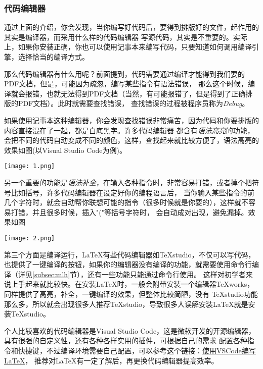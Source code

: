 \subsubsection{代码编辑器}


通过上面的介绍，你会发现，当你编写好代码后，要得到排版好的文件，起作用的其实是编译器，而采用什么样的代码编辑器
写源代码，其实是不重要的。实际上，如果你安装正确，你也可以使用记事本来编写代码，只要知道如何调用编译引擎，选择恰当的编译方式。

那么代码编辑器有什么用呢？前面提到，代码需要通过编译才能得到我们要的PDF文档，但是，可能因为疏忽，编写某些指令有语法错误，
那么这个时候，编译就会报错，也就无法得到PDF文档（当然，有可能报错了，但是得到了正确排版的PDF文档）。此时就需要查找错误，
查找错误的过程被程序员称为\emph{Debug}。

如果使用记事本这种编辑器，你会发现查找错误非常痛苦，因为代码和你要排版的内容直接混在了一起，都是白底黑字。许多代码编辑器
都含有\emph{语法高亮}的功能，会把不同的代码自动变成不同的颜色，这样，查找起来就比较方便了，语法高亮的效果如图(以Visual Studio Code为例)。
\begin{center}
  \texttt{[image: 1.png]}
\end{center}

另一个重要的功能是\emph{语法补全}，在输入各种指令时，非常容易打错，或者掉个把符号比如括号，许多代码编辑器在设定好你的编程语言后，
当你输入某些指令的前几个字符时，就会自动帮你联想可能的指令（很多时候就是你要的），这样就不容易打错，并且很多时候，插入"("等括号字符时，
会自动成对出现，避免漏掉。效果如图
\begin{center}
  \texttt{[image: 2.png]}
\end{center}

第三个方面是编译运行，\LaTeX{}有些代码编辑器如TeXstudio，不仅可以写代码，也提供了一键编译的按钮，如果你的编辑器没有编译的功能，就需要使用命令行编译（详见\ref{subsec:mlh}节），还有一些功能只能通过命令行使用。
这样对初学者来说上手起来就比较快。在安装\LaTeX{}时，一般会附带安装一个编辑器TeXworks，同样提供了高亮，补全，一键编译的效果，但整体比较简陋，没有
TeXstudio功能那么多，所以就会出现很多人推荐TeXstudio，导致很多人误解安装\LaTeX{}就是安装TeXstudio。

个人比较喜欢的代码编辑器是Visual Studio Code，这是微软开发的开源编辑器，具有很强的自定义性，还有各种各样实用的插件，可根据自己的需求
配置各种指令和快捷键，不过编译环境需要自己配置，可以参考这个链接：\href{https://zhuanlan.zhihu.com/p/38178015?utm_source=qq&utm_medium=social&utm_oi=1122597840500740096}{使用VSCode编写LaTeX}，
推荐对\LaTeX{}有一定了解后，再更换代码编辑器提高效率。



